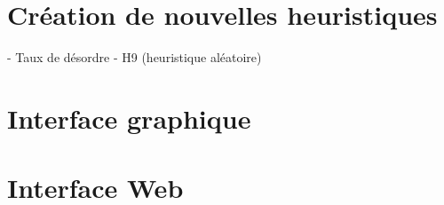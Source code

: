 \documentclass[10pt,a4paper]{report}
\begin{document}
\section{Création de nouvelles heuristiques}
- Taux de désordre
- H9 (heuristique aléatoire)
\section{Interface graphique}
\section{Interface Web}
\end{document}
